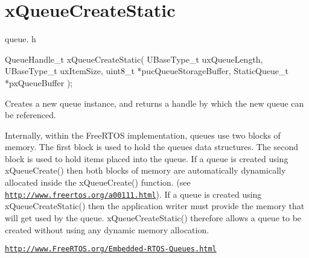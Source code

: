 \hypertarget{group__x_queue_create_static}{}\section{x\+Queue\+Create\+Static}
\label{group__x_queue_create_static}
queue. h 
\begin{DoxyPre}
QueueHandle\_t xQueueCreateStatic(
                          UBaseType\_t uxQueueLength,
                          UBaseType\_t uxItemSize,
                          uint8\_t *pucQueueStorageBuffer,
                          StaticQueue\_t *pxQueueBuffer
                      );
  \end{DoxyPre}


Creates a new queue instance, and returns a handle by which the new queue can be referenced.

Internally, within the Free\+R\+T\+OS implementation, queues use two blocks of memory. The first block is used to hold the queue\textquotesingle{}s data structures. The second block is used to hold items placed into the queue. If a queue is created using x\+Queue\+Create() then both blocks of memory are automatically dynamically allocated inside the x\+Queue\+Create() function. (see \href{http://www.freertos.org/a00111.html}{\tt http\+://www.\+freertos.\+org/a00111.\+html}). If a queue is created using x\+Queue\+Create\+Static() then the application writer must provide the memory that will get used by the queue. x\+Queue\+Create\+Static() therefore allows a queue to be created without using any dynamic memory allocation.

\href{http://www.FreeRTOS.org/Embedded-RTOS-Queues.html}{\tt http\+://www.\+Free\+R\+T\+O\+S.\+org/\+Embedded-\/\+R\+T\+O\+S-\/\+Queues.\+html}


